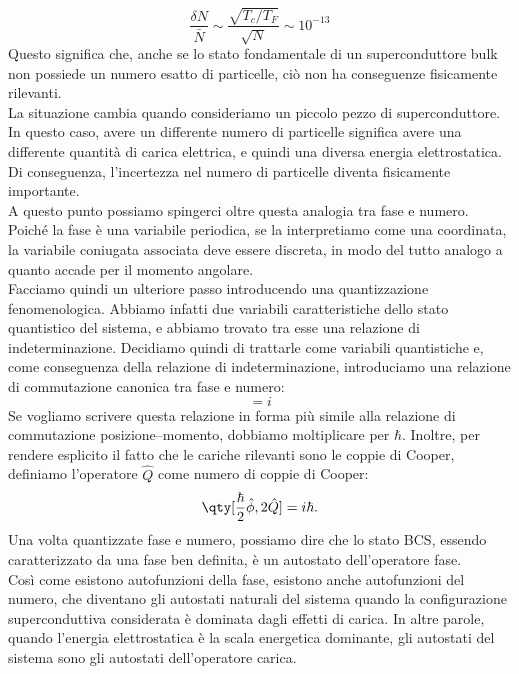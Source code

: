\begin{equation*}
    \frac{\delta N}{\bar{N}}
    \sim
    \frac{\sqrt{T_c/T_F}}{\sqrt{N}}
    \sim
    10^{-13}
\end{equation*}
Questo significa che, anche se lo stato fondamentale di un superconduttore bulk non possiede un numero esatto di particelle, ciò non ha conseguenze fisicamente rilevanti.\\
La situazione cambia quando consideriamo un piccolo pezzo di superconduttore. In questo caso, avere un differente numero di particelle significa avere una differente quantità di carica elettrica, e quindi una diversa energia elettrostatica. Di conseguenza, l'incertezza nel numero di particelle diventa fisicamente importante.\\
A questo punto possiamo spingerci oltre questa analogia tra fase e numero. Poiché la fase è una variabile periodica, se la interpretiamo come una coordinata, la variabile coniugata associata deve essere discreta, in modo del tutto analogo a quanto accade per il momento angolare.\\
Facciamo quindi un ulteriore passo introducendo una quantizzazione fenomenologica. Abbiamo infatti due variabili caratteristiche dello stato quantistico del sistema, e abbiamo trovato tra esse una relazione di indeterminazione. Decidiamo quindi di trattarle come variabili quantistiche e, come conseguenza della relazione di indeterminazione, introduciamo una relazione di commutazione canonica tra fase e numero:
\begin{equation*}
    [\hat{\phi},\hat{N}]
    =
    i
\end{equation*}
Se vogliamo scrivere questa relazione in forma più simile alla relazione di commutazione posizione--momento, dobbiamo moltiplicare per $\hbar$. Inoltre, per rendere esplicito il fatto che le cariche rilevanti sono le coppie di Cooper, definiamo l'operatore $\hat{Q}$ come numero di coppie di Cooper:
\begin{equation*}
    \qty[
        \frac{\hbar}{2}\hat{\phi},
        2\hat{Q}
    ]
    =
    i\hbar.
\end{equation*}
Una volta quantizzate fase e numero, possiamo dire che lo stato BCS, essendo caratterizzato da una fase ben definita, è un autostato dell'operatore fase.\\
Così come esistono autofunzioni della fase, esistono anche autofunzioni del numero, che diventano gli autostati naturali del sistema quando la configurazione superconduttiva considerata è dominata dagli effetti di carica. In altre parole, quando l'energia elettrostatica è la scala energetica dominante, gli autostati del sistema sono gli autostati dell'operatore carica.\\
